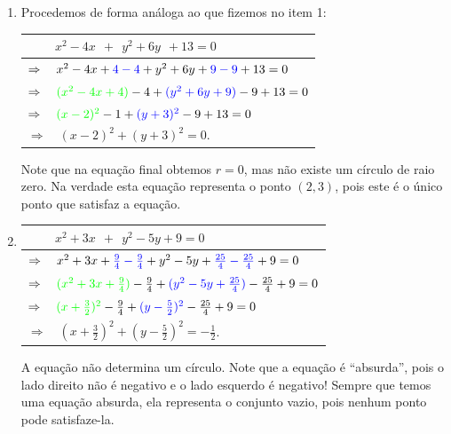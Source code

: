 \documentclass[
  brazilian,
  letterpaper,
  DIV=11,
  numbers=noendperiod]{scrreprt}
\newcounter{none} %
\theoremstyle{definition}
\theoremstyle{plain}
\theoremstyle{definition}
\theoremstyle{remark}
\begin{document}
\begin{itemize}
\begin{enumerate}
    Assim temos um círculo de centro em \((1,-2)\) e raio
    \(r=\sqrt{3}\).
  \item
    Procedemos de forma análoga ao que fizemos no item 1:

    {\def\LTcaptype{none} %
    \begin{longtable}[]{@{}
      >{\raggedright\arraybackslash}p{}@{}}
    \toprule\noalign{}
    \begin{minipage}[b]{\linewidth}\raggedright
    \(\qquad \ x^2-4x\ \ + \ \ y^2+6y \ \ +13=0\)
    \end{minipage} \\
    \midrule\noalign{}
    \endhead
    \bottomrule\noalign{}
    \endlastfoot
    \(\Rightarrow \quad x^2-4x+{\color{blue}4-4}+y^2+6y+{\color{blue}9-9}+13=0\) \\
    \(\Rightarrow \quad{\color{green}(x^2-4x+4)}-4+{\color{blue}(y^2+6y+9)}-9+13=0\) \\
    \(\Rightarrow \quad{\color{green}(x-2)^2}-1+{\color{blue}(y+3)^2}-9+13=0\) \\
    \(\Rightarrow \quad (x-2)^2+(y+3)^2=0\). \\
    \end{longtable}
    }

    Note que na equação final obtemos \(r=0\), mas não existe um círculo
    de raio zero. Na verdade esta equação representa o ponto \((2,3)\),
    pois este é o único ponto que satisfaz a equação.
  \item
    {\def\LTcaptype{none} %
    \begin{longtable}[]{@{}
      >{\raggedright\arraybackslash}p{}@{}}
    \toprule\noalign{}
    \begin{minipage}[b]{\linewidth}\raggedright
    \(\qquad \ x^2+3x \ \ + \ \ y^2-5y+9=0\)
    \end{minipage} \\
    \midrule\noalign{}
    \endhead
    \bottomrule\noalign{}
    \endlastfoot
    \(\Rightarrow \quad x^2+3x+{\color{blue}\frac{9}{4}-\frac{9}{4}}+y^2-5y+{\color{blue}\frac{25}{4}-\frac{25}{4}}+9=0\) \\
    \(\Rightarrow \quad{\color{green}(x^2+3x+\frac{9}{4})}-\frac{9}{4}+{\color{blue}(y^2-5y+\frac{25}{4})}-\frac{25}{4}+9=0\) \\
    \(\Rightarrow \quad {\color{green}(x+\frac{3}{2})^2}-\frac{9}{4}+{\color{blue}(y-\frac{5}{2})^2}-\frac{25}{4}+9=0\) \\
    \(\Rightarrow \quad (x+\frac{3}{2})^2+ (y-\frac{5}{2})^2=-\frac{1}{2}\). \\
    \end{longtable}
    }

    A equação não determina um círculo. Note que a equação é
    ``absurda'', pois o lado direito não é negativo e o lado esquerdo é
    negativo! Sempre que temos uma equação absurda, ela representa o
    conjunto vazio, pois nenhum ponto pode satisfaze-la.
  \end{enumerate}
\end{itemize}
\end{document}

